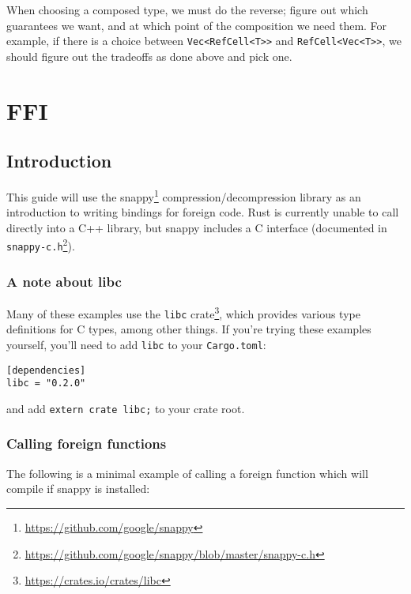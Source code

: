 \documentclass[a4paper,]{book}
\renewcommand*{\hypertarget}[3][\ar]{%
  \def\ar{#2}%
  \label{#1}%
  #3}
\renewcommand{\href}[2]{#2\footnote{\url{#1}}}
\begin{document}
When choosing a composed type, we must do the reverse; figure out which
guarantees we want, and at which point of the composition we need them.
For example, if there is a choice between
\texttt{Vec\textless{}RefCell\textless{}T\textgreater{}\textgreater{}}
and
\texttt{RefCell\textless{}Vec\textless{}T\textgreater{}\textgreater{}},
we should figure out the tradeoffs as done above and pick one.

\hypertarget{sec--ffi}{\section{FFI}\label{sec--ffi}}

\subsection{Introduction}\label{introduction-1}

This guide will use the \href{https://github.com/google/snappy}{snappy}
compression/decompression library as an introduction to writing bindings
for foreign code. Rust is currently unable to call directly into a C++
library, but snappy includes a C interface (documented in
\href{https://github.com/google/snappy/blob/master/snappy-c.h}{\texttt{snappy-c.h}}).

\subsubsection{A note about libc}\label{a-note-about-libc}

Many of these examples use \href{https://crates.io/crates/libc}{the
\texttt{libc} crate}, which provides various type definitions for C
types, among other things. If you're trying these examples yourself,
you'll need to add \texttt{libc} to your \texttt{Cargo.toml}:

\begin{verbatim}
[dependencies]
libc = "0.2.0"
\end{verbatim}

and add \texttt{extern\ crate\ libc;} to your crate root.

\subsubsection{Calling foreign
functions}\label{calling-foreign-functions}

The following is a minimal example of calling a foreign function which
will compile if snappy is installed:
\end{document}
